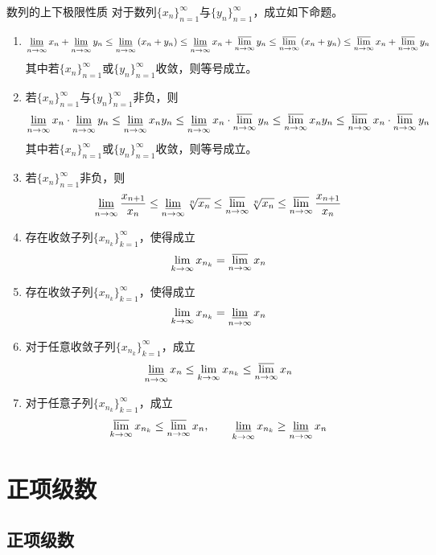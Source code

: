 \documentclass[lang = cn, scheme = chinese, thmcnt = section]{elegantbook}
\begin{document}
\begin{proposition}{数列的上下极限性质}
	对于数列$\{x_n\}_{n=1}^{\infty}$与$\{y_n\}_{n=1}^{\infty}$，成立如下命题。
	\begin{enumerate}
		\item 
		$$
		\varliminf_{n\to\infty}{x_n}+\varliminf_{n\to\infty}{y_n}
		\le \varliminf_{n\to\infty}{(x_n+y_n)}
		\le \varliminf_{n\to\infty}{x_n}+\varlimsup_{n\to\infty}{y_n}
		\le \varlimsup_{n\to\infty}{(x_n+y_n)}
		\le \varlimsup_{n\to\infty}{x_n}+\varlimsup_{n\to\infty}{y_n}
		$$
		其中若$\{x_n\}_{n=1}^{\infty}$或$\{y_n\}_{n=1}^{\infty}$收敛，则等号成立。
		\item 若$\{x_n\}_{n=1}^{\infty}$与$\{y_n\}_{n=1}^{\infty}$非负，则
		$$
		\varliminf_{n\to\infty}{x_n}\cdot\varliminf_{n\to\infty}{y_n}
		\le \varliminf_{n\to\infty}{x_ny_n}
		\le \varliminf_{n\to\infty}{x_n}\cdot\varlimsup_{n\to\infty}{y_n}
		\le \varlimsup_{n\to\infty}{x_ny_n}
		\le \varlimsup_{n\to\infty}{x_n}\cdot\varlimsup_{n\to\infty}{y_n}
		$$
		其中若$\{x_n\}_{n=1}^{\infty}$或$\{y_n\}_{n=1}^{\infty}$收敛，则等号成立。
		\item 若$\{x_n\}_{n=1}^{\infty}$非负，则
		$$
		\varliminf_{n\to\infty}\frac{x_{n+1}}{x_n}
		\le \varliminf_{n\to\infty}\sqrt[n]{x_n}
		\le \varlimsup_{n\to\infty}\sqrt[n]{x_n}
		\le \varlimsup_{n\to\infty}\frac{x_{n+1}}{x_n}
		$$
		\item 存在收敛子列$\{x_{n_k}\}_{k=1}^{\infty}$，使得成立
		$$
		\lim_{k\to\infty}x_{n_k}=\varlimsup_{n\to\infty}{x_n}
		$$
		\item 存在收敛子列$\{x_{n_k}\}_{k=1}^{\infty}$，使得成立
		$$
		\lim_{k\to\infty}x_{n_k}=\varliminf_{n\to\infty}{x_n}
		$$
		\item 对于任意收敛子列$\{x_{n_k}\}_{k=1}^{\infty}$，成立
		$$
		\varliminf_{n\to\infty}{x_n}\le
		\lim_{k\to\infty}x_{n_k}
		\le\varlimsup_{n\to\infty}{x_n}
		$$
		\item 对于任意子列$\{x_{n_k}\}_{k=1}^{\infty}$，成立
		$$
		\varlimsup_{k\to\infty}x_{n_k}\le\varlimsup_{n\to\infty}x_{n},
		\qquad
		\varliminf_{k\to\infty}x_{n_k}\ge\varliminf_{n\to\infty}x_{n}
		$$
	\end{enumerate}
\end{proposition}

\section{正项级数}

\subsection{正项级数}
\end{document}
